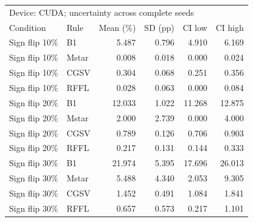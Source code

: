 \begin{tabular}{llrrrr}
\toprule
\multicolumn{6}{l}{Device: CUDA; uncertainty across complete seeds} \\
Condition & Rule & Mean (\%) & SD (pp) & CI low & CI high \\
\midrule
Sign flip 10\% & B1 & 5.487 & 0.796 & 4.910 & 6.169 \\
Sign flip 10\% & Mstar & 0.008 & 0.018 & 0.000 & 0.024 \\
Sign flip 10\% & CGSV & 0.304 & 0.068 & 0.251 & 0.356 \\
Sign flip 10\% & RFFL & 0.028 & 0.063 & 0.000 & 0.084 \\
Sign flip 20\% & B1 & 12.033 & 1.022 & 11.268 & 12.875 \\
Sign flip 20\% & Mstar & 2.000 & 2.739 & 0.000 & 4.000 \\
Sign flip 20\% & CGSV & 0.789 & 0.126 & 0.706 & 0.903 \\
Sign flip 20\% & RFFL & 0.217 & 0.131 & 0.144 & 0.333 \\
Sign flip 30\% & B1 & 21.974 & 5.395 & 17.696 & 26.013 \\
Sign flip 30\% & Mstar & 5.488 & 4.340 & 2.053 & 9.305 \\
Sign flip 30\% & CGSV & 1.452 & 0.491 & 1.084 & 1.841 \\
Sign flip 30\% & RFFL & 0.657 & 0.573 & 0.217 & 1.101 \\
\bottomrule
\end{tabular}
